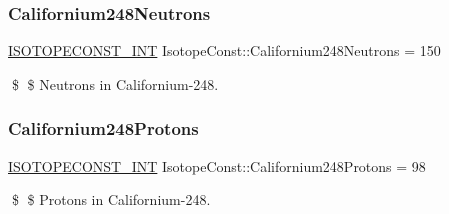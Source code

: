 \subsubsection{\texorpdfstring{Californium248\+Neutrons}{Californium248Neutrons}}
{\footnotesize\ttfamily \mbox{\hyperlink{group___isotope_const-_macros_ga5f18360b3e99483a35c32d789e62621c}{I\+S\+O\+T\+O\+P\+E\+C\+O\+N\+S\+T\+\_\+\+I\+NT}} Isotope\+Const\+::\+Californium248\+Neutrons = 150}

\$ \$ Neutrons in Californium-\/248. \mbox{\label{group___isotope_const-_californium-_cf248_ga7a99ffedaa2aa91e15e846e651973777}} 
\subsubsection{\texorpdfstring{Californium248\+Protons}{Californium248Protons}}
{\footnotesize\ttfamily \mbox{\hyperlink{group___isotope_const-_macros_ga5f18360b3e99483a35c32d789e62621c}{I\+S\+O\+T\+O\+P\+E\+C\+O\+N\+S\+T\+\_\+\+I\+NT}} Isotope\+Const\+::\+Californium248\+Protons = 98}

\$ \$ Protons in Californium-\/248. 